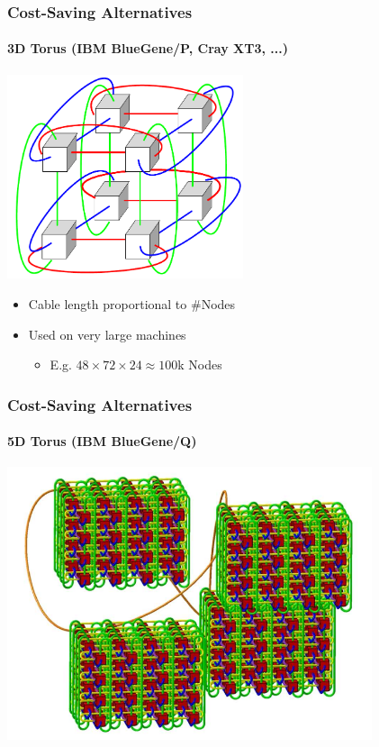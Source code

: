 \documentclass[xcolor={rgb,x11names,svgnames},rgb,x11names,svgnames]{beamer}
\begin{document}
\begin{frame}
  \frametitle{Cost-Saving Alternatives}
  \framesubtitle{3D Torus (IBM BlueGene/P, Cray XT3, ...)}

  \begin{center}
    \includegraphics[height=6cm]{2x2x2torus.pdf}
  \end{center}

  \begin{itemize}
  \item Cable length \alert{proportional} to \#Nodes
  \item Used on very large machines
    \begin{itemize}
    \item E.g. $48 \times 72 \times 24 \approx 100$k Nodes
    \end{itemize}
  \end{itemize}
\end{frame}


\begin{frame}
  \frametitle{Cost-Saving Alternatives}
  \framesubtitle{5D Torus (IBM BlueGene/Q)}

  \centering
  \includegraphics[height=8cm]{5D_torus.pdf}
\end{frame}
\end{document}
